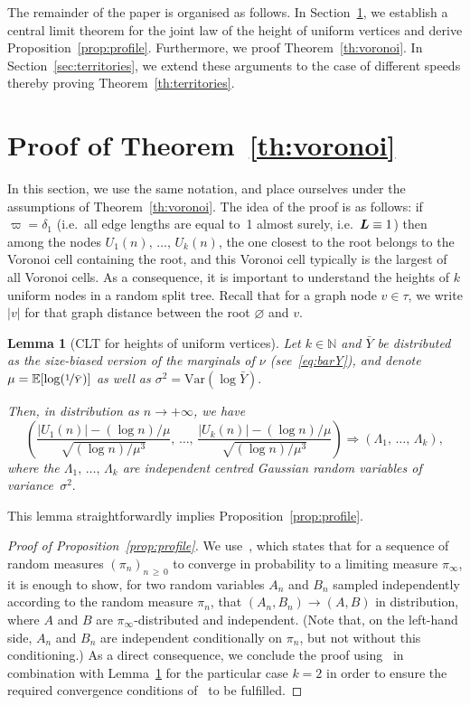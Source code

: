 \documentclass[10pt]{amsart}
\newtheorem{lemm}[theo]{Lemma}\newtheorem{prop}[theo]{Proposition}\newtheorem{coro}[theo]{Corollary}\newtheorem{conj}[theo]{Conjecture}
\theoremstyle{definition}\newtheorem{defi}[theo]{Definition}\newtheorem{rema}[theo]{Remark}\newtheorem{exam}[theo]{Example}\newtheorem{exem}[theo]{Example}\newtheorem{nota}[theo]{Notation}
\newcommand{\bs}{\ensuremath{\boldsymbol}}
\newcommand{\bbE}{\mathbb{E}}
\newcommand{\bbN}{\mathbb{N}}
\newcommand{\Var}{\mathrm{Var}}
\begin{document}
The remainder of the paper is organised as follows. In Section~\ref{sec:voronoi}, we establish a central limit theorem for the joint law of the height of uniform vertices and derive Proposition~\ref{prop:profile}. Furthermore, we proof Theorem~\ref{th:voronoi}. In Section~\ref{sec:territories}, we extend these arguments to the case of different speeds thereby proving Theorem~\ref{th:territories}.



\section{Proof of Theorem~\ref{th:voronoi}}\label{sec:voronoi}
In this section, we use the same notation, and place ourselves under the assumptions of Theorem~\ref{th:voronoi}. The idea of the proof is as follows: if $\varpi = \delta_1$ (i.e.\ all edge lengths are equal to~1 almost surely, i.e.\ $\bs L \equiv 1$) then among the nodes $U_1(n), \,\ldots,\, U_k(n)$, the one closest to the root belongs to the Voronoi cell containing the root, and this Voronoi cell typically is the largest of all Voronoi cells. As a consequence, it is important to understand the heights of $k$ uniform nodes in a random split tree. Recall that for a graph node $v\in\tau$, we write $|v|$ for that graph distance between the root $\varnothing$ and $v$.

\begin{lemm}[CLT for heights of uniform vertices]\label{lem:height_unif}
Let $k\in\bbN$ and $\bar Y$ be distributed as the size-biased version of the marginals of $\nu$ (see~\eqref{eq:barY}), and denote $\mu = \bbE[\log (\nicefrac1{\bar Y})]$ as well as $\sigma^2 = \Var(\log \bar Y).$

Then, in distribution as $n\to+\infty$, we have
\[
\left(\frac{|U_1(n)| - (\log n)/\mu}{\sqrt{(\log n)/\mu^3}},\,\ldots,\,
\frac{|U_k(n)| - (\log n)/\mu}{\sqrt{(\log n)/\mu^3}}
\right)\Rightarrow (\Lambda_1,\,\ldots,\,\Lambda_k),
\]
where the $\Lambda_1, \,\ldots,\,\Lambda_k$ are independent centred Gaussian random variables of variance~$\sigma^2.$
\end{lemm}

This lemma straightforwardly implies Proposition~\ref{prop:profile}.

\begin{proof}[{Proof of Proposition~\ref{prop:profile}}] We use~\cite[Lemma~3.1]{MM17}, which states that for a sequence of random measures $(\pi_n)_{n\,\geq\,0}$ to converge in probability to a limiting measure $\pi_{\infty}$, it is enough to show,
for two random variables $A_n$ and $B_n$ sampled independently according to the random measure $\pi_n$, that $(A_n, B_n) \to (A, B)$ in distribution, where $A$ and $B$ are $\pi_\infty$-distributed and independent. (Note that, on the left-hand side, $A_n$ and $B_n$ are independent conditionally on $\pi_n$, but not without this conditioning.) As a direct consequence, we conclude the proof using~\cite[Lemma~3.1]{MM17} in combination with Lemma~\ref{lem:height_unif} for the particular case $k=2$ in order to ensure the required convergence conditions of~\cite[Lemma~3.1]{MM17} to be fulfilled.
\end{proof}
\end{document}
